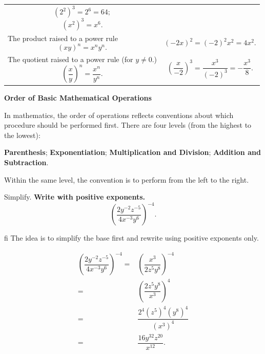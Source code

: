 \documentclass[en,12pt]{elegantbook}
\newenvironment{rmdnote}{
    \par\noindent
    \makebox[-\width][r]{
    \tiny\color{red!90}
    \textdbend
    \hspace*{2pt}
    }
    \makebox[\width][l]{
        \hspace*{3pt}
        \textbf{
            \color{second}
            Note 
        }
    }
    \begin{shaded}
    \itshape
}{
    \par
    \end{shaded}
}
\let\BeginKnitrBlock\begin \let\EndKnitrBlock\end
\begin{document}
\begin{longtable}[]{@{}ll@{}}
\begin{minipage}[t]{0.47\columnwidth}
\[\left(2^{2}\right)^3=2^6=64;\] \[\left(x^2\right)^3=x^6.\]\strut
\end{minipage}\tabularnewline
\begin{minipage}[t]{0.47\columnwidth}\raggedright
The product raised to a power rule \[(xy)^n=x^ny^n.\]\strut
\end{minipage} & \begin{minipage}[t]{0.47\columnwidth}\raggedright
\[\left(-2x\right)^{2}=(-2)^2x^2=4x^2.\]\strut
\end{minipage}\tabularnewline
\begin{minipage}[t]{0.47\columnwidth}\raggedright
The quotient raised to a power rule (for \(y\neq 0\).) \[\left(\dfrac{x}{y}\right)^n=\dfrac{x^n}{y^n}.\]\strut
\end{minipage} & \begin{minipage}[t]{0.47\columnwidth}\raggedright
\[    \left(\dfrac{x}{-2}\right)^{3}=\dfrac{x^3}{(-2)^3}=-\dfrac{x^3}{8}.\]\strut
\end{minipage}\tabularnewline
\bottomrule
\end{longtable}

\begin{rmdnote}

\textbf{Order of Basic Mathematical Operations}

In mathematics, the order of operations reflects conventions about which procedure should be performed first. There are four levels (from the highest to the lowest):

\textbf{Parenthesis}; \textbf{Exponentiation}; \textbf{Multiplication and Division}; \textbf{Addition and Subtraction}.

Within the same level, the convention is to perform from the left to the right.

\end{rmdnote}

\BeginKnitrBlock{example}
\protect\hypertarget{exm:unnamed-chunk-1}{}{\label{exm:unnamed-chunk-1} }
Simplify. \textbf{Write with positive exponents.}
\[
\left(\dfrac{2y^{-2}z^{-5}}{4x^{-3}y^6}\right)^{-4}.
\]
\EndKnitrBlock{example}

\BeginKnitrBlock{solution}
fi{}
The idea is to simplify the base first and rewrite using positive exponents only.

\[
\begin{aligned}
    \left(\dfrac{2y^{-2}z^{-5}}{4x^{-3}y^6}\right)^{-4}
=&\left(\dfrac{x^3}{2z^{5}y^8}\right)^{-4}\\
=&\left(\dfrac{2z^{5}y^8}{x^3}\right)^4\\
=&\dfrac{2^4(z^{5})^4(y^8)^4}{(x^3)^4}\\
=&\dfrac{16y^{32}z^{20}}{x^{12}}.\\
\end{aligned}
\]
\EndKnitrBlock{solution}
\end{document}
